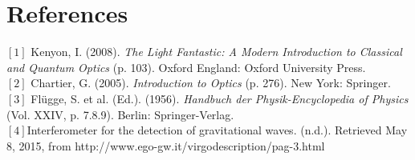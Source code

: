 \documentclass[a4paper,12pt]{report}
\begin{document}
\chapter{References}
$[1]$ Kenyon, I. (2008). \textit{The Light Fantastic: A Modern Introduction to Classical and Quantum Optics} (p. 103). Oxford England: Oxford University Press.\\
$[2]$  Chartier, G. (2005). \textit{Introduction to Optics} (p. 276). New York: Springer.\\
$[3]$ Flügge, S. et al. (Ed.). (1956). \textit{Handbuch der Physik-Encyclopedia of Physics} (Vol. XXIV, p. 7.8.9). Berlin: Springer-Verlag.\\
$[4]$Interferometer for the detection of gravitational waves. (n.d.). Retrieved May 8, 2015, from http://www.ego-gw.it/virgodescription/pag-3.html
\end{document}
